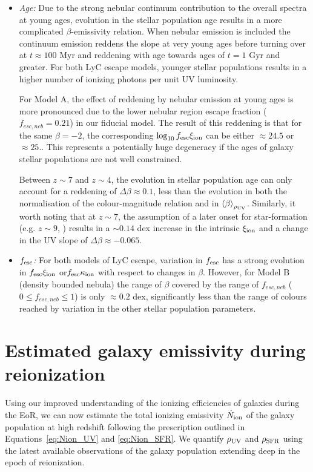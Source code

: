 \begin{itemize}
    \item \emph{Age:} Due to the strong nebular continuum contribution to the overall spectra at young ages, evolution in the stellar population age results in a more complicated $\beta$-emissivity relation. When nebular emission is included the continuum emission reddens the slope at very young ages before turning over at $t\approx100$ Myr and reddening with age towards ages of $t = 1$ Gyr and greater. For both LyC escape models, younger stellar populations results in a higher number of ionizing photons per unit UV luminosity. 

    For Model A, the effect of reddening by nebular emission at young ages is more pronounced due to the lower nebular region escape fraction ($f_{esc,neb} = 0.21$) in our fiducial model. The result of this reddening is that for the same $\beta = -2$, the corresponding $\log_{10} f_{\rm{esc}}\xi_{\rm{ion}}$ can be either $\approx 24.5$ or $\approx 25.$. This represents a potentially huge degeneracy if the ages of galaxy stellar populations are not well constrained.
    
    Between $z\sim 7$ and $z\sim4$, the evolution in stellar population age can only account for a reddening of $\Delta\beta \approx 0.1$, less than the evolution in both the normalisation of the colour-magnitude relation and in $\left \langle \beta  \right \rangle_{\rho_{\rm{UV}}}$. Similarly, it worth noting that at $z\sim7$, the assumption of a later onset for star-formation (e.g. $z\sim 9$, \citet{Collaboration:2015tp}) results in a $\sim0.14$ dex increase in the intrinsic $\xi_{\rm{ion}}$ and a change in the UV slope of $\Delta\beta \approx -0.065$. 
    
    \item \emph{$f_{\rm{esc}}$:} For both models of LyC escape, variation in $f_{\rm{esc}}$ has a strong evolution in $f_{\rm{esc}}\xi_{\rm{ion}}$ or$f_{\rm{esc}}\kappa_{\rm{ion}}$ with respect to changes in $\beta$. However, for Model B (density bounded nebula) the range of $\beta$ covered by the range of $f_{esc,neb}$ ($0 \leq f_{esc,neb} \leq 1$) is only $\approx 0.2$ dex, significantly less than the range of colours reached by variation in the other stellar population parameters.
\end{itemize}


\section{Estimated galaxy emissivity during reionization}\label{sec:results}
Using our improved understanding of the ionizing efficiencies of galaxies during the EoR, we can now estimate the total ionizing emissivity $\dot{N}_{\rm{ion}}$ of the galaxy population at high redshift following the prescription outlined in Equations~\ref{eq:Nion_UV} and \ref{eq:Nion_SFR}. We quantify $\rho_{\rm{UV}}$ and $\rho_{\rm{SFR}}$ using the latest available observations of the galaxy population extending deep in the epoch of reionization.

